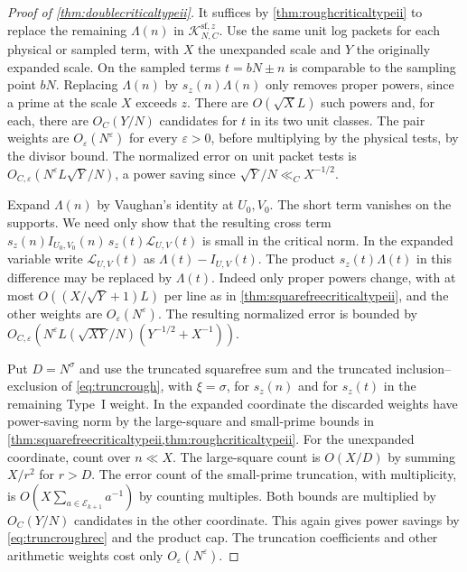 \documentclass[11pt,a4paper]{article}
\numberwithin{equation}{section}
\begin{document}
\begin{proof}[Proof of \cref{thm:doublecriticaltypeii}]
It suffices by \cref{thm:roughcriticaltypeii} to replace
the remaining $\Lambda(n)$ in $\mathcal K^{\mathrm{sf},z}_{N,C}$.
Use the same unit log packets for each physical or sampled
term, with $X$ the unexpanded scale and $Y$ the originally
expanded scale. On the sampled terms $t=bN\pm n$ is
comparable to the sampling point $bN$.
Replacing $\Lambda(n)$ by $s_z(n)\Lambda(n)$ only removes
proper powers, since a prime at the scale $X$ exceeds $z$.
There are $O(\sqrt X L)$ such powers and, for each, there
are $O_C(Y/N)$ candidates for $t$ in its two unit classes.
The pair weights are $O_\varepsilon(N^\varepsilon)$
for every $\varepsilon>0$, before multiplying by the
physical tests, by the divisor bound. The normalized
error on unit packet tests is
$O_{C,\varepsilon}(N^\varepsilon L\sqrt Y/N)$, a power saving
since $\sqrt Y/N\ll_C X^{-1/2}$.

Expand $\Lambda(n)$ by Vaughan's identity at $U_0,V_0$.
The short term vanishes on the supports. We need only
show that the resulting cross term
$s_z(n)I_{U_0,V_0}(n)\,s_z(t)\mathcal L_{U,V}(t)$
is small in the critical norm.
In the expanded variable write $\mathcal L_{U,V}(t)$ as
$\Lambda(t)-I_{U,V}(t)$. The product $s_z(t)\Lambda(t)$ in
this difference may be replaced by $\Lambda(t)$.
Indeed only proper powers change, with at most
$O((X/\sqrt Y+1)L)$ per line as in
\cref{thm:squarefreecriticaltypeii}, and the other
weights are $O_\varepsilon(N^\varepsilon)$.
The resulting normalized error is bounded by
$O_{C,\varepsilon}(N^\varepsilon L(\sqrt{XY}/N)
 (Y^{-1/2}+X^{-1}))$.

Put $D=N^\sigma$ and use the truncated squarefree sum and
the truncated inclusion--exclusion of \cref{eq:truncrough},
with $\xi=\sigma$, for $s_z(n)$ and for $s_z(t)$ in the
remaining Type~I weight. In the expanded coordinate the
discarded weights have power-saving norm by the
large-square and small-prime bounds in
\cref{thm:squarefreecriticaltypeii,thm:roughcriticaltypeii}.
For the unexpanded coordinate, count over $n\ll X$.
The large-square count is $O(X/D)$ by summing $X/r^2$
for $r>D$. The error count of the small-prime truncation,
with multiplicity, is
$O(X\sum_{a\in\mathcal E_{k+1}}a^{-1})$ by counting multiples.
Both bounds are multiplied by $O_C(Y/N)$ candidates
in the other coordinate. This again gives power savings
by \cref{eq:truncroughrec} and the product cap. The
truncation coefficients and other arithmetic weights
cost only $O_\varepsilon(N^\varepsilon)$.


\end{proof}
\end{document}
